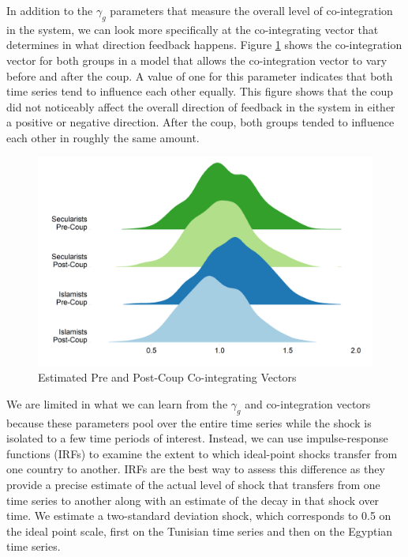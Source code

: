 \documentclass[12pt]{article}
\begin{document}
In addition to the $\gamma_g$ parameters that measure the overall level of co-integration in the system, we can look more specifically at the co-integrating vector that determines in what direction feedback happens. Figure \ref{adj} shows the co-integration vector for both groups in a model that allows the co-integration vector to vary before and after the coup. A value of one for this parameter indicates that both time series tend to influence each other equally. This figure shows that the coup did not noticeably affect the overall direction of feedback in the system in either a positive or negative direction. After the coup, both groups tended to influence each other in roughly the same amount.
 \begin{figure}[!h]
	\centering
	\caption{Estimated Pre and Post-Coup Co-integrating Vectors}\label{adj}
	\centering
	\includegraphics[width=.9\linewidth]{adj_joy}
\end{figure}
	
We are limited in what we can learn from the $\gamma_g$ and co-integration vectors because these parameters pool over the entire time series while the shock is isolated to a few time periods of interest. Instead, we can use impulse-response functions (IRFs) to examine the extent to which ideal-point shocks transfer from one country to another. IRFs are the best way to assess this difference as they provide a precise estimate of the actual level of shock that transfers from one time series to another along with an estimate of the decay in that shock over time. We estimate a two-standard deviation shock, which corresponds to 0.5 on the ideal point scale, first on the Tunisian time series and then on the Egyptian time series. 
\end{document}
